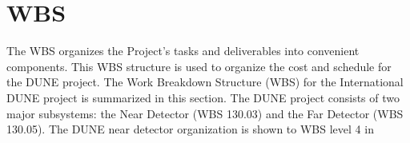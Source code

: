 \section[Work Breakdown Structure (WBS)]{WBS}

The WBS organizes the Project's tasks and deliverables into convenient components. 
This WBS structure is used to organize the cost and schedule for the DUNE project.
The Work Breakdown Structure (WBS) for the International DUNE project is summarized
in this section.
The DUNE project consists of two major subsystems: the Near Detector (WBS 130.03) and
the Far Detector (WBS 130.05).
The DUNE near detector organization is shown to WBS level 4 in 
